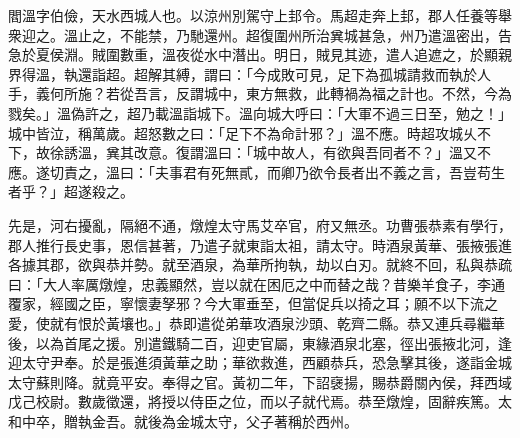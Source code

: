 \begin{pinyinscope}

閻溫字伯儉，天水西城人也。以涼州別駕守上邽令。馬超走奔上邽，郡人任養等舉衆迎之。溫止之，不能禁，乃馳還州。超復圍州所治兾城甚急，州乃遣溫密出，告急於夏侯淵。賊圍數重，溫夜從水中潛出。明日，賊見其迹，遣人追遮之，於顯親界得溫，執還詣超。超解其縛，謂曰：「今成敗可見，足下為孤城請救而執於人手，義何所施？若從吾言，反謂城中，東方無救，此轉禍為福之計也。不然，今為戮矣。」溫偽許之，超乃載溫詣城下。溫向城大呼曰：「大軍不過三日至，勉之！」城中皆泣，稱萬歲。超怒數之曰：「足下不為命計邪？」溫不應。時超攻城乆不下，故徐誘溫，兾其改意。復謂溫曰：「城中故人，有欲與吾同者不？」溫又不應。遂切責之，溫曰：「夫事君有死無貳，而卿乃欲令長者出不義之言，吾豈苟生者乎？」超遂殺之。

先是，河右擾亂，隔絕不通，燉煌太守馬艾卒官，府又無丞。功曹張恭素有學行，郡人推行長史事，恩信甚著，乃遣子就東詣太祖，請太守。時酒泉黃華、張掖張進各據其郡，欲與恭并勢。就至酒泉，為華所拘執，劫以白刃。就終不回，私與恭疏曰：「大人率厲燉煌，忠義顯然，豈以就在困厄之中而替之哉？昔樂羊食子，李通覆家，經國之臣，寧懷妻孥邪？今大軍垂至，但當促兵以掎之耳；願不以下流之愛，使就有恨於黃壤也。」恭即遣從弟華攻酒泉沙頭、乾齊二縣。恭又連兵尋繼華後，以為首尾之援。別遣鐵騎二百，迎吏官屬，東緣酒泉北塞，徑出張掖北河，逢迎太守尹奉。於是張進須黃華之助；華欲救進，西顧恭兵，恐急擊其後，遂詣金城太守蘇則降。就竟平安。奉得之官。黃初二年，下詔襃揚，賜恭爵關內侯，拜西域戊己校尉。數歲徵還，將授以侍臣之位，而以子就代焉。恭至燉煌，固辭疾篤。太和中卒，贈執金吾。就後為金城太守，父子著稱於西州。

\end{pinyinscope}
